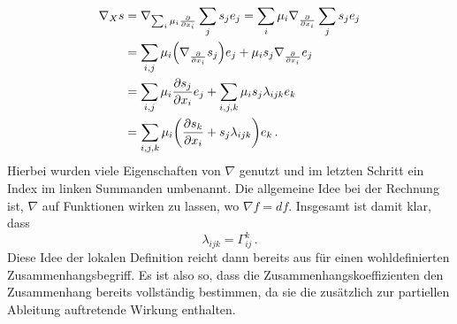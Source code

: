 \begin{align}
\nabla_X s &= \nabla_{\sum_i \mu_i \pdv{x_i}} \sum_j s_j e_j = \sum_i \mu_i \nabla_{\pdv{x_i}} \sum_j s_j e_j
\notag\\
&= \sum_{i, j} \mu_i \qty(\nabla_{\pdv{x_i}} s_j) e_j + \mu_i s_j \nabla_{\pdv{x_i}} e_j
\notag\\
&= \sum_{i, j} \mu_i \pdv{s_j}{x_i} e_j + \sum_{i, j, k} \mu_i s_j \lambda_{ijk} e_k
\notag\\
&= \sum_{i, j, k} \mu_i \qty(\pdv{s_k}{x_i} + s_j \lambda_{ijk}) e_k \, .
\end{align}
Hierbei wurden viele Eigenschaften von $\nabla$ genutzt und im letzten Schritt ein Index im linken Summanden umbenannt. Die allgemeine Idee bei der Rechnung ist, $\nabla$ auf Funktionen wirken zu lassen, wo $\nabla f = df$. Insgesamt ist damit klar, dass
\begin{equation}
\lambda_{ijk} = \Gamma_{ij}^k \, .%
\end{equation}
Diese Idee der lokalen Definition reicht dann bereits aus für einen wohldefinierten Zusammenhangsbegriff. Es ist also so, dass die Zusammenhangskoeffizienten den Zusammenhang bereits vollständig bestimmen, da sie die zusätzlich zur partiellen Ableitung auftretende Wirkung enthalten.

